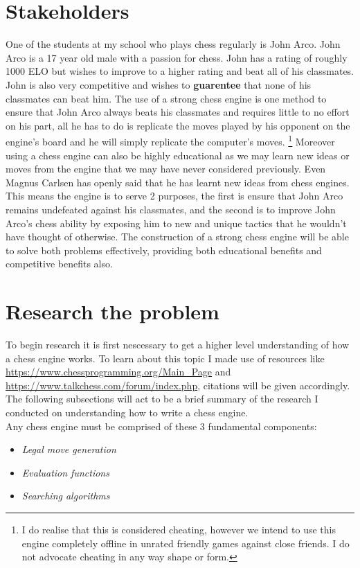 \section{Stakeholders}
One of the students at my school who plays chess regularly is 
John Arco. John Arco is a 17 year old male with a passion for chess.
John has a rating of roughly 1000 ELO but wishes 
to improve to a higher rating and beat all of his 
classmates. John is also very competitive and wishes to 
\textbf{guarentee} that none of his classmates can beat him.
The use of a strong chess engine is one method to ensure
that John Arco always beats his classmates and requires little
to no effort on his part, all he has to do is replicate the 
moves played by his opponent on the engine's board and he 
will simply replicate the computer's moves. 
\footnote{I do realise that this is considered cheating,
however we intend to use this engine completely offline
in unrated friendly games against close friends. 
I do not advocate cheating in any way shape or form.}
Moreover using a chess engine can also be highly educational as
we may learn new ideas or moves from the engine that we may have
never considered previously. Even Magnus Carlsen
has openly said that he has learnt new ideas from chess engines.
\cite{lex} This means the engine is to serve 2 purposes,
the first is ensure that John Arco remains undefeated 
against his classmates, and the second is to improve John Arco's
chess ability by exposing him to new and unique tactics that 
he wouldn't have thought of otherwise. The construction of 
a strong chess engine will be able to solve both problems
effectively, providing both educational benefits and 
competitive benefits also.

\section{Research the problem}
To begin research it is first nescessary to get a higher level understanding
of how a chess engine works. To learn about this topic
I made use of resources like \url{https://www.chessprogramming.org/Main_Page}
and \url{https://www.talkchess.com/forum/index.php}, citations will be 
given accordingly. The following subsections will act to be 
a brief summary of the research I conducted on understanding
how to write a chess engine.\\

Any chess engine must be comprised of these 3 fundamental components:
\begin{itemize}
  \item \textit{Legal move generation}
  \item \textit{Evaluation functions}
  \item \textit{Searching algorithms}\\
\end{itemize}


